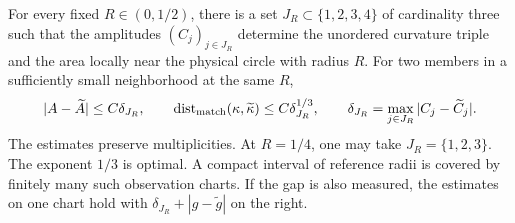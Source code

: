 \begin{theorem}
\label{thm:v6-three}
For every fixed $R\in(0,1/2)$, there is a set
$J_R\subset\{1,2,3,4\}$ of cardinality three such that the amplitudes
$(C_j)_{j\in J_R}$ determine the unordered curvature triple and the
area locally near the physical circle with radius $R$. For two members
in a sufficiently small neighborhood at the same $R$,
\[
 |A-\widetilde A|\le C\delta_{J_R},\qquad
 \operatorname{dist}_{\rm match}(\kappa,\widetilde\kappa)
       \le C\delta_{J_R}^{1/3},\qquad
 \delta_{J_R}=\max_{j\in J_R}|C_j-\widetilde C_j|.
\]
The estimates preserve multiplicities. At $R=1/4$, one may take
$J_R=\{1,2,3\}$. The exponent $1/3$ is optimal. A compact interval
of reference radii is covered by finitely many such observation charts.
If the gap is also measured, the estimates on one chart hold with
$\delta_{J_R}+|g-\widetilde g|$ on the right.
\end{theorem}
